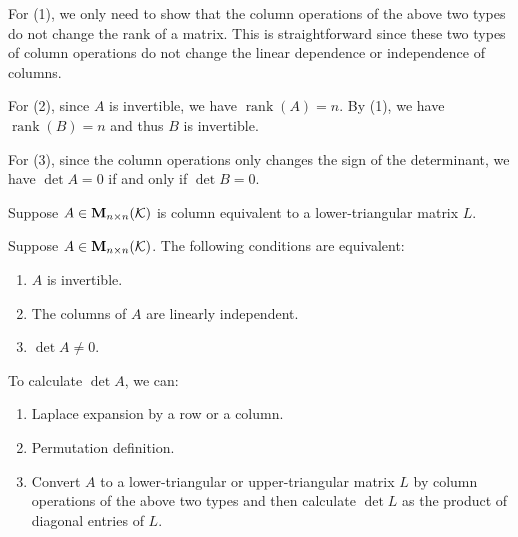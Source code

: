     \begin{proofenv}
        For (1), we only need to show that the column operations of the above two types do not change the rank of a matrix. This is straightforward since these two types of column operations do not change the linear dependence or independence of columns.

        For (2), since $A$ is invertible, we have $\operatorname{rank}(A) = n$. By (1), we have $\operatorname{rank}(B) = n$ and thus $B$ is invertible.

        For (3), since the column operations only changes the sign of the determinant, we have $\det A = 0$ if and only if $\det B = 0$.
    \end{proofenv}
    \begin{theoremenv}
        Suppose $A\in \mathbf{M}_{n \times n}(\mathcal{K})$ is column equivalent to a lower-triangular matrix $L$.
    \end{theoremenv}
    \begin{theoremenv}
        Suppose $A\in \mathbf{M}_{n \times n}(\mathcal{K})$. The following conditions are equivalent:
        \begin{enumerate}
            \item $A$ is invertible.
            \item The columns of $A$ are linearly independent.
            \item $\det A \neq 0$.
        \end{enumerate}
    \end{theoremenv}
    \begin{remarkenv}
        To calculate $\det A$, we can:
        \begin{enumerate}
            \item Laplace expansion by a row or a column.
            \item Permutation definition.
            \item Convert $A$ to a lower-triangular or upper-triangular matrix $L$ by column operations of the above two types and then calculate $\det L$ as the product of diagonal entries of $L$.
        \end{enumerate}
    \end{remarkenv}

